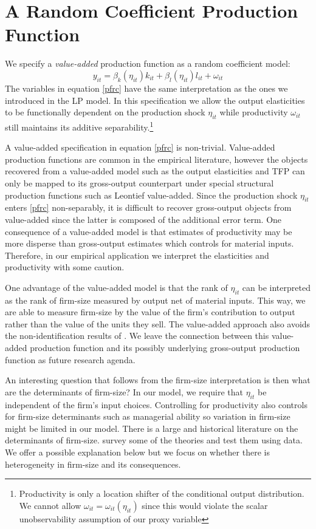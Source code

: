\documentclass[11pt]{article}
\begin{document}
\section{A Random Coefficient Production Function} \label{ourmodel}
We specify a \textit{value-added} production function as a random coefficient model:
\begin{equation} \label{pfrc}
    y_{it}=\beta_{k}(\eta_{it})k_{it}+\beta_{l}(\eta_{it})l_{it}+\omega_{it}
\end{equation}
The variables in equation \eqref{pfrc} have the same interpretation as the ones we introduced in the LP model. In this specification we allow the output elasticities to be functionally dependent on the production shock $\eta_{it}$ while productivity $\omega_{it}$ still maintains its additive separability.\footnote{Productivity is only a location shifter of the conditional output distribution. We cannot allow $\omega_{it}=\omega_{it}(\eta_{it})$ since this would violate the scalar unobservability assumption of our proxy variable}

A value-added specification in equation \eqref{pfrc} is non-trivial. Value-added production functions are common in the empirical literature, however the objects recovered from a value-added model such as the output elasticities and TFP can only be mapped to its gross-output counterpart under special structural production functions such as Leontief value-added. Since the production shock $\eta_{it}$ enters \eqref{pfrc} non-separably, it is difficult to recover gross-output objects from value-added since the latter is composed of the additional error term. One consequence of a value-added model is that estimates of productivity may be more disperse than gross-output estimates which controls for material inputs. Therefore, in our empirical application we interpret the elasticities and productivity with some caution.

 One advantage of the value-added model is that the rank of $\eta_{it}$ can be interpreted as the rank of firm-size measured by output net of material inputs. This way, we are able to measure firm-size by the value of the firm's contribution to output rather than the value of the units they sell. The value-added approach also avoids the non-identification results of \cite{Gandhi2020}. We leave the connection between this value-added production function and its possibly underlying gross-output production function as future research agenda.

 An interesting question that follows from the firm-size interpretation is then what are the determinants of firm-size? In our model, we require that $\eta_{it}$ be independent of the firm's input choices. Controlling for productivity also controls for firm-size determinants such as managerial ability so variation in firm-size might be limited in our model. There is a large and historical literature on the determinants of firm-size. \cite{Kumar1999} survey some of the theories and test them using data. We offer a possible explanation below but we focus on whether there is heterogeneity in firm-size and its consequences. 
\end{document}

